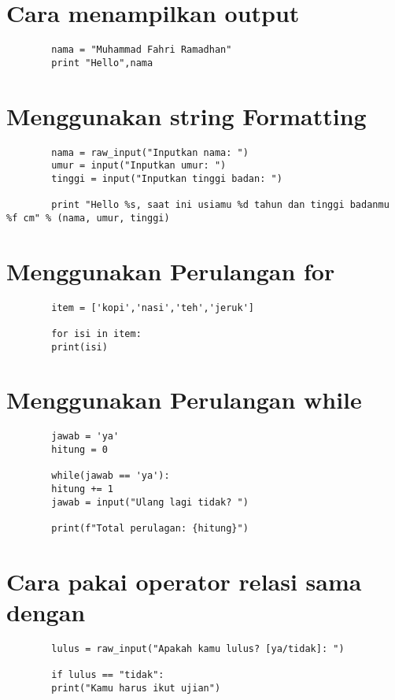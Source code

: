 \documentclass{article}
\begin{document}
	\section{Cara menampilkan output}
	\begin{lstlisting}
		nama = "Muhammad Fahri Ramadhan"
		print "Hello",nama
	\end{lstlisting}

	\section{Menggunakan string Formatting}
	\begin{lstlisting}
		nama = raw_input("Inputkan nama: ")
		umur = input("Inputkan umur: ")
		tinggi = input("Inputkan tinggi badan: ")
		
		print "Hello %s, saat ini usiamu %d tahun dan tinggi badanmu %f cm" % (nama, umur, tinggi)
	\end{lstlisting}

	\section{Menggunakan Perulangan for}
	\begin{lstlisting}
		item = ['kopi','nasi','teh','jeruk']
		
		for isi in item:
		print(isi)
	\end{lstlisting}

	\section{Menggunakan Perulangan while}
	\begin{lstlisting}
		jawab = 'ya'
		hitung = 0
		
		while(jawab == 'ya'):
		hitung += 1
		jawab = input("Ulang lagi tidak? ")
		
		print(f"Total perulagan: {hitung}")
	\end{lstlisting}

	\section{Cara pakai operator relasi sama dengan}
	\begin{lstlisting}
		lulus = raw_input("Apakah kamu lulus? [ya/tidak]: ")
		
		if lulus == "tidak":
		print("Kamu harus ikut ujian")
	\end{lstlisting}
\end{document}
